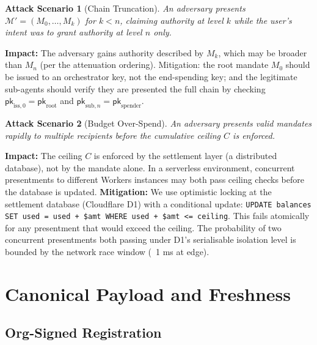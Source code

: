 \documentclass[conference]{IEEEtran}
\newtheorem{attack}{Attack Scenario}
\newcommand{\pk}{\mathsf{pk}}
\begin{document}
\begin{attack}[Chain Truncation]
\label{attack:truncate}
An adversary presents $\mathcal{M}' = (M_0, \ldots, M_k)$
for $k < n$, claiming authority at level $k$ while the
user's intent was to grant authority at level $n$ only.
\end{attack}
\textbf{Impact:} The adversary gains authority described by
$M_k$, which may be broader than $M_n$ (per the attenuation
ordering). Mitigation: the root mandate $M_0$ should be
issued to an orchestrator key, not the end-spending key;
and the legitimate sub-agents should verify they are
presented the full chain by checking $\pk_{\text{iss},0} =
\pk_{\text{root}}$ and $\pk_{\text{sub},n} =
\pk_{\text{spender}}$.

\begin{attack}[Budget Over-Spend]
\label{attack:budget}
An adversary presents valid mandates rapidly to multiple
recipients before the cumulative ceiling $C$ is enforced.
\end{attack}
\textbf{Impact:} The ceiling $C$ is enforced by the
settlement layer (a distributed database), not by the
mandate alone. In a serverless environment, concurrent
presentments to different Workers instances may both pass
ceiling checks before the database is updated.
\textbf{Mitigation:} We use optimistic locking at the
settlement database (Cloudflare D1) with a conditional
update: \texttt{UPDATE balances SET used = used + \$amt
WHERE used + \$amt <= ceiling}. This fails atomically for
any presentment that would exceed the ceiling. The
probability of two concurrent presentments both passing
under D1's serialisable isolation level is bounded by the
network race window (~1 ms at edge).

\section{Canonical Payload and Freshness}
\label{sec:protocol}

\subsection{Org-Signed Registration}
\end{document}
